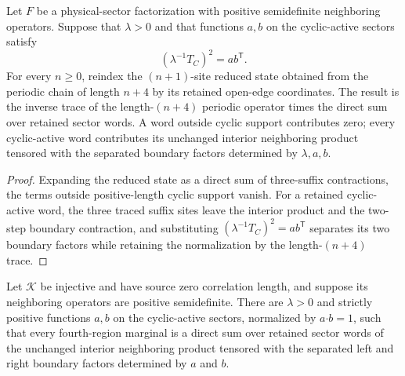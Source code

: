 \begin{lemma}
    \label{thm:mpdo_cyclic_active_explicit_fourth_region_blocks}
    \leanok
    Let $F$ be a physical-sector factorization with positive semidefinite
    neighboring operators. Suppose that $\lambda>0$ and that functions
    $a,b$ on the cyclic-active sectors satisfy
    \[
        (\lambda^{-1}T_C)^2=a b^{\mathsf T}.
    \]
    For every $n\geq0$, reindex the $(n+1)$-site reduced state obtained from
    the periodic chain of length $n+4$ by its retained open-edge coordinates.
    The result is the inverse trace of the length-$(n+4)$ periodic operator
    times the direct sum over retained sector words. A word outside cyclic
    support contributes zero; every cyclic-active word contributes its
    unchanged interior neighboring product tensored with the separated
    boundary factors determined by $\lambda,a,b$.
\end{lemma}

\begin{proof}\leanok
    Expanding the reduced state as a direct sum of three-suffix contractions,
    the terms outside positive-length cyclic support vanish. For a retained
    cyclic-active word, the three traced suffix sites leave the interior
    product and the two-step boundary contraction, and substituting
    $(\lambda^{-1}T_C)^2=a b^{\mathsf T}$ separates its two boundary
    factors while retaining the normalization by the length-$(n+4)$ trace.
\end{proof}

\begin{lemma}
    \label{thm:mpdo_cyclic_active_fourth_region_factorization}
    \leanok
    Let $\mathcal K$ be injective and have source zero correlation length,
    and suppose its neighboring operators are positive semidefinite. There
    are $\lambda>0$ and strictly positive functions $a,b$ on the
    cyclic-active sectors, normalized by $a\mathbin{\boldsymbol\cdot}b=1$,
    such that every fourth-region marginal is a direct sum over retained
    sector words of the unchanged interior neighboring product tensored with
    the separated left and right boundary factors determined by $a$ and $b$.

\end{lemma}

